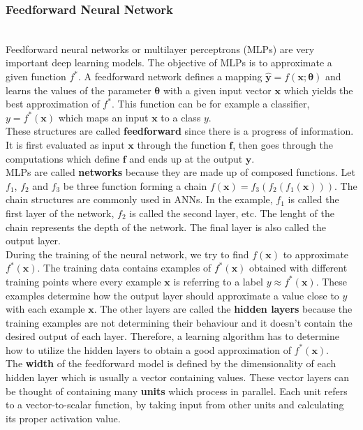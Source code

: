 
\subsubsection{Feedforward Neural Network}~\\

Feedforward neural networks or multilayer perceptrons (MLPs) are very important
deep learning models. The objective of MLPs is to approximate a given function
$f^{*}$. A feedforward network defines a mapping $\bm{\hat{y}} = f(\bm{x};
\bm{\theta})$ and learns the values of the parameter $\bm{\theta}$ with a given
input vector $\bm{x}$ which yields the best approximation of $f^{*}$. This
function can be for example a classifier, $y = f^{*}(\bm{x})$ which maps an
input $\bm{x}$ to a class $y$.\\

These structures are called \textbf{feedforward} since there is a progress of
information. It is first evaluated as input $\bm{x}$ through the function
$\bm{f}$, then goes through the computations which define $\bm{f}$ and ends up
at the output $\bm{y}$.\\

MLPs are called \textbf{networks} because they are made up of composed
functions. Let $f_{1}$, $f_{2}$ and $f_{3}$ be three function forming a chain
$f(\bm{x}) = f_{3}(f_{2}(f_{1}(\bm{x})))$. The chain structures are commonly
used in ANNs. In the example, $f_{1}$ is called the first layer of the network,
$f_{2}$ is called the second layer, etc. The lenght of the chain represents the
depth of the network. The final layer is also called the output layer.\\

During the training of the neural network, we try to find $f(\bm{x})$ to
approximate $f^{*}(\bm{x})$. The training data contains examples of
$f^{*}(\bm{x})$ obtained with different training points where every example
$\bm{x}$ is referring to a label $y \approx f^{*}(\bm{x})$. These examples
determine how the output layer should approximate a value close to $y$ with each
example $\bm{x}$. The other layers are called the \textbf{hidden layers} because
the training examples are not determining their behaviour and it doesn't contain
the desired output of each layer. Therefore, a learning algorithm has to
determine how to utilize the hidden layers to obtain a good approximation of
$f^{*}(\bm{x})$.\\

The \textbf{width} of the feedforward model is defined by the dimensionality of
each hidden layer which is usually a vector containing values. These vector
layers can be thought of containing many \textbf{units} which process in
parallel. Each unit refers to a vector-to-scalar function, by taking input from
other units and calculating its proper activation value.\\

